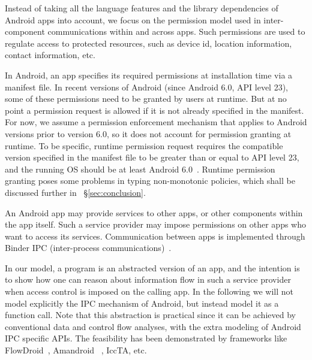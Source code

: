 Instead of taking all the language features and the library dependencies of Android apps into account, we focus on the permission model used in inter-component communications within and across apps. Such permissions are used to regulate access to protected resources, such as device id, location information, contact information, etc.

In Android, an app specifies its required permissions at installation time via a manifest file. In recent versions of Android (since Android 6.0, API level 23), some of these permissions need to be granted by users at runtime. But
at no point a permission request is allowed if it is not already specified in the manifest.
For now, we assume a permission enforcement mechanism that applies to Android versions prior to version 6.0, so it does not
account for permission granting at runtime. To be specific, runtime permission request requires the compatible version specified in the manifest file to be greater than or equal to API level 23, and the running OS should be at least Android 6.0~\cite{url:android-perm}. Runtime permission granting poses some problems in typing non-monotonic policies, which shall be discussed further in ~\S\ref{sec:conclusion}.

An Android app may provide services to other apps,
or other components within the app itself. Such a service provider
may impose permissions on other apps who want to
access its services. Communication between apps is implemented
through Binder IPC (inter-process communications)~\cite{Android-Binder-IPC}.

In our model, a program is an abstracted version of an app, and the intention is to show how one can reason about information flow in such a service provider when access control is imposed on the calling app. In the following we will not model explicitly the IPC mechanism of Android, but instead model it as a function call. Note that this abstraction is practical since it can be achieved by conventional data and control flow analyses, with the extra modeling of Android IPC specific APIs. The feasibility has been demonstrated by frameworks like FlowDroid~\cite{Arzt:2014:FPC:2666356.2594299}, Amandroid~\cite{Wei:2014:APG:2660267.2660357}%
, IccTA\cite{Li:2015:IDI:2818754.2818791}, etc.

